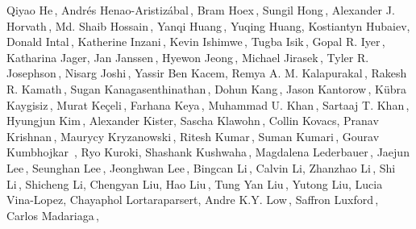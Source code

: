 \begin{center}
Qiyao He\,,\;
Andrés Henao-Aristizábal\,,\;
Bram Hoex\,,\;
Sungil Hong\,,\;
Alexander J. Horvath\,,\;
Md. Shaib Hossain\,,\;
Yanqi Huang\,,\;
Yuqing Huang,\;
Kostiantyn Hubaiev,\;
Donald Intal\,,\;
Katherine Inzani\,,\;
Kevin Ishimwe\,,\;
Tugba Isik\,,\;
Gopal R. Iyer\,,\;
Katharina Jager,\;
Jan Janssen\,,\;
Hyewon Jeong\,,\;
Michael Jirasek\,,\;
Tyler R. Josephson\,,\;
Nisarg Joshi\,,\;
Yassir Ben Kacem,\;
Remya A. M. Kalapurakal\,,\;
Rakesh R. Kamath\,,\;
Sugan Kanagasenthinathan\,,\;
Dohun Kang\,,\;
Jason Kantorow\,,\;
Kübra Kaygisiz\,,\;
Murat Ke\c{c}eli\,,\;
Farhana Keya\,,\;
Muhammad U. Khan\,,\;
Sartaaj T. Khan\,,\;
Hyungjun Kim\,,\;
Alexander Kister,\;
Sascha Klawohn\,,\;
Collin Kovacs,\;
Pranav Krishnan\,,\;
Maurycy Kryzanowski\,,\;
Ritesh Kumar\,,\;
Suman Kumari\,,\;
Gourav Kumbhojkar\, ,\;
Ryo Kuroki,\;
Shashank Kushwaha\,,\;
Magdalena Lederbauer\,,\;
Jaejun Lee\,,\;
Seunghan Lee\,,\;
Jeonghwan Lee\,,\;
Bingcan Li\,,\;
Calvin Li,\;
Zhanzhao Li\,,\;
Shi Li\,,\;
Shicheng Li,\;
Chengyan Liu,\;
Hao Liu\,,\;
Tung Yan Liu\,,\;
Yutong Liu,\;
Lucia Vina-Lopez,\;
Chayaphol Lortaraparsert,\;
Andre K.Y. Low\,,\;
Saffron Luxford\,,\;
Carlos Madariaga\,,\;

\end{center}
